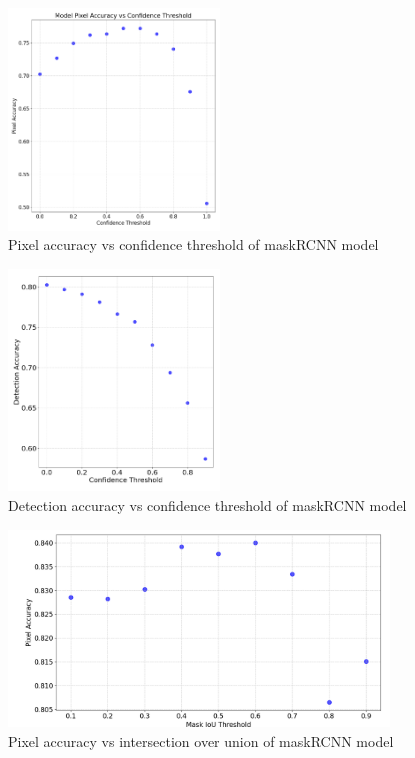 \documentclass[final]{cmpreport_02}
\begin{document}
\begin{figure}[h!]
	\centering
	\includegraphics[width=0.5\textwidth]{./images/AEConfidenceThreshold.png}
	\caption{Pixel accuracy vs confidence threshold of maskRCNN model}
	\label{AE:ConfidenceThreshold}
\end{figure}

\begin{figure}[h!]
	\centering
	\includegraphics[width=0.5\textwidth]{./images/AEConfidenceThresholdDetect.png}
	\caption{Detection accuracy vs confidence threshold of maskRCNN model}
	\label{AE:ConfidenceThresholdDetect}
\end{figure}

\begin{figure}[h!]
	\centering
	\includegraphics[width=0.9\textwidth]{./images/AEIOUThresholdPixel.png}
	\caption{Pixel accuracy vs intersection over union of maskRCNN model}
	\label{AE:IOUThreshold}
\end{figure}
\end{document}
